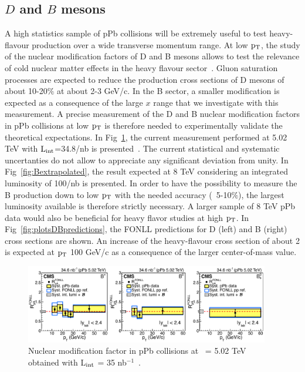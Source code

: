 \subsection{$D$ and $B$ mesons}
A high statistics sample of pPb collisions will be extremely useful 
to test heavy-flavour production over a wide transverse momentum range.
At low $\rm p_{T}$, the study of the nuclear modification factors of 
D and B mesons allows to test the relevance of cold nuclear matter 
effects in the heavy flavour sector~\cite{Eskola:2009uj,deFlorian:2003qf,Frankfurt:2011cs}. 
Gluon saturation processes are expected to reduce the production 
cross sections of D mesons of about 10-20$\%$ at about 2-3 GeV/c.  
In the B sector, a smaller modification is expected as a consequence 
of the large $x$ range that we investigate with this measurement.
A precise measurement of the D and B nuclear modification factors 
in pPb collisions at low $\rm p_{T}$ is therefore needed to experimentally 
validate the theoretical expectations. In Fig~\ref{fig:measurementB}, 
the current measurement performed at 5.02 TeV with $\rm L_{int}$=34.8/nb 
is presented~\cite{PhysRevLett.116.032301}. The current statistical 
and systematic uncertanties do not allow to appreciate any significant 
deviation from unity. In Fig~\ref{fig:Bextrapolated}, the result expected 
at 8 TeV considering an integrated luminosity of 100/nb is presented. 
In order to have the possibility to measure the B production down to 
low $\rm p_{T}$ with the needed accuracy (~5-10$\%$), 
the largest luminosity available is therefore strictly necessary.  
A larger sample of 8 TeV pPb data would also be beneficial for heavy 
flavor studies at high $\rm p_{T}$.  In Fig~\ref{fig:plotsDBpredictions}, 
the FONLL predictions for D (left) and B (right) cross sections are shown. 
An increase of the heavy-flavour cross section of about 2 is
expected at $\rm p_{T}~$100 GeV/c as a consequence of the larger 
center-of-mass value. 

\begin{figure}[h]
\begin{center}
\includegraphics[width= 0.95\textwidth]{figures/nuclearmodification.pdf}
\caption{Nuclear modification factor in pPb collisions at \rootsNN\ = 5.02 TeV 
obtained with L$_{\rm int}$ = 35 nb$^{-1}$~\cite{PhysRevLett.116.032301}.}
\label{fig:measurementB}
\end{center}
\end{figure}

